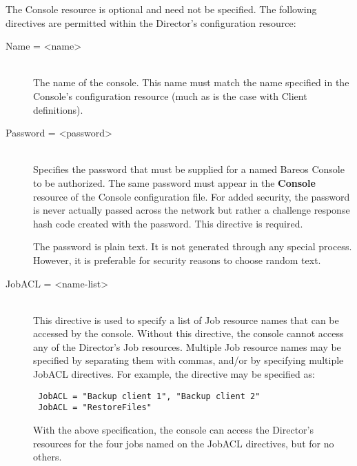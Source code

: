 The Console resource is optional and need not be specified. The following
directives are permitted within the Director's configuration resource:



\begin{description}

\item [Name = {\textless}name{\textgreater}] \hfill \\
The name of the console. This  name must match the name specified in the
Console's configuration  resource (much as is the case with Client
definitions).

\item [Password = {\textless}password{\textgreater}] \hfill \\
Specifies the password that must be supplied for a named Bareos Console
to be authorized.  The same password must appear in the {\bf Console}
resource of the Console configuration file.  For added security, the
password is never actually passed across the network but rather a
challenge response hash code created with the password.  This directive
is required.

The password is plain text.  It is not generated through any special
process.  However, it is preferable for security reasons to choose
random text.

\item [JobACL = {\textless}name-list{\textgreater}] \hfill \\
This directive is used to specify a list of Job resource names that can
be accessed by the console.  Without this directive, the console cannot
access any of the Director's Job resources.  Multiple Job resource names
may be specified by separating them with commas, and/or by specifying
multiple JobACL directives.  For example, the directive may be specified
as:

\footnotesize
\begin{verbatim}
 JobACL = "Backup client 1", "Backup client 2"
 JobACL = "RestoreFiles"

\end{verbatim}
\normalsize

With the above specification, the console can access the Director's  resources
for the four jobs named on the JobACL directives,  but for no others.


\end{description}
